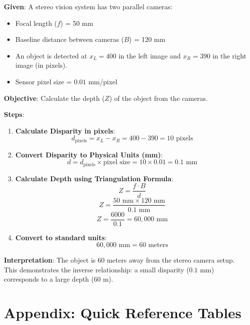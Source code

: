 \documentclass[11pt,a4paper]{article}
\begin{document}
\begin{tcolorbox}[colback=orange!5!white,colframe=orange!75!black,title=\textbf{Worked Example 17: Depth Estimation using Stereo Vision}]
\textbf{Given}:
A stereo vision system has two parallel cameras:
\begin{itemize}
    \item Focal length ($f$) = 50 mm
    \item Baseline distance between cameras ($B$) = 120 mm
    \item An object is detected at $x_L = 400$ in the left image and $x_R = 390$ in the right image (in pixels).
    \item Sensor pixel size = $0.01$ mm/pixel
\end{itemize}

\textbf{Objective}: Calculate the depth ($Z$) of the object from the cameras.

\textbf{Steps}:
\begin{enumerate}
    \item \textbf{Calculate Disparity in pixels}:
    \[ d_{\text{pixels}} = x_L - x_R = 400 - 390 = 10 \text{ pixels} \]
    \item \textbf{Convert Disparity to Physical Units (mm)}:
    \[ d = d_{\text{pixels}} \times \text{pixel size} = 10 \times 0.01 = 0.1 \text{ mm} \]
    \item \textbf{Calculate Depth using Triangulation Formula}:
    \[ Z = \frac{f \cdot B}{d} \]
    \[ Z = \frac{50 \text{ mm} \times 120 \text{ mm}}{0.1 \text{ mm}} \]
    \[ Z = \frac{6000}{0.1} = 60{,}000 \text{ mm} \]
    \item \textbf{Convert to standard units}:
    \[ 60{,}000 \text{ mm} = 60 \text{ meters} \]
\end{enumerate}

\textbf{Interpretation}: The object is 60 meters away from the stereo camera setup. This demonstrates the inverse relationship: a small disparity ($0.1$ mm) corresponds to a large depth ($60$ m).
\end{tcolorbox}

\newpage

\section*{Appendix: Quick Reference Tables}
\end{document}
